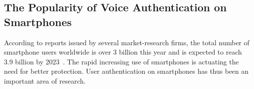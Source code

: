 %




\subsection{The Popularity of Voice Authentication on Smartphones}

According to reports issued by several market-research firms, the total number of smartphone users worldwide is over 3 billion this year and is expected to reach 3.9 billion by 2023~\cite{report2018newzoo,report2019forrester}. The rapid increasing use of smartphones is actuating the need for better protection. User authentication on smartphones has thus been an important area of research. 

